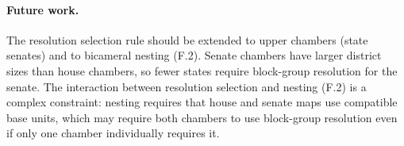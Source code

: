 \paragraph{Future work.}
The resolution selection rule should be extended to upper chambers (state senates)
and to bicameral nesting (F.2). Senate chambers have larger district sizes than
house chambers, so fewer states require block-group resolution for the senate.
The interaction between resolution selection and nesting (F.2) is a complex
constraint: nesting requires that house and senate maps use compatible base
units, which may require both chambers to use block-group resolution even if
only one chamber individually requires it.
